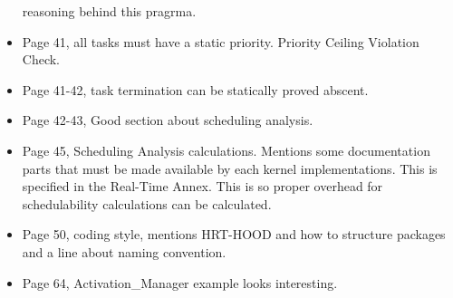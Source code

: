 \begin{itemize}
        reasoning behind this pragrma.
    \item Page 41, all tasks must have a static priority. Priority Ceiling
        Violation Check.
    \item Page 41-42, task termination can be statically proved abscent.
    \item Page 42-43, Good section about scheduling analysis.
    \item Page 45, Scheduling Analysis calculations. Mentions some
        documentation parts that must be made available by each kernel
        implementations. This is specified in the Real-Time Annex. This is so
        proper overhead for schedulability calculations can be calculated.
    \item Page 50, coding style, mentions HRT-HOOD and how to structure
        packages and a line about naming convention.
    \item Page 64, Activation\_Manager example looks interesting.
\end{itemize}

%
%
%
